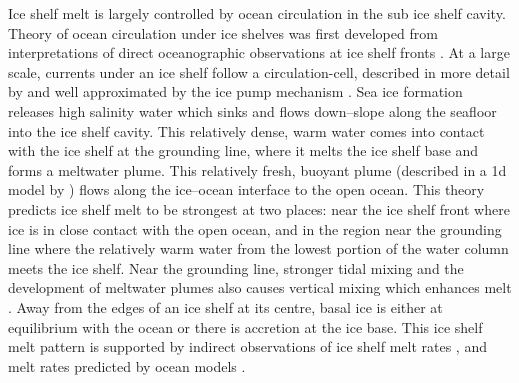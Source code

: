 
Ice shelf melt is largely controlled by ocean circulation in the sub ice shelf cavity. Theory of ocean circulation under ice shelves was first developed from interpretations of direct oceanographic observations at ice shelf fronts \cite [e.g.][] {jacobs1979circulation}.
At a large scale, currents under an ice shelf follow a circulation-cell, described in more detail by \cite{jacobs1992melting} and well approximated by the ice pump mechanism \citep{lewis1986ice}.
Sea ice formation releases high salinity water which sinks and flows down--slope along the seafloor into the ice shelf cavity. This relatively dense, warm water comes into contact with the ice shelf at the grounding line, where it melts the ice shelf base and forms a meltwater plume. This relatively fresh, buoyant plume (described in a 1d model by \cite{jenkins1991one}) flows along the ice--ocean interface to the open ocean. 
This theory predicts ice shelf melt to be strongest at two places: near the ice shelf front where ice is in close contact with the open ocean, and in the region near the grounding line where the relatively warm water from the lowest portion of the water column meets the ice shelf. Near the grounding line, stronger tidal mixing and the development of meltwater plumes also causes vertical mixing which enhances melt \citep{macayeal1984thermohaline, macayeal1985evolution}. Away from the edges of an ice shelf at its centre, basal ice is either at equilibrium with the ocean or there is accretion at the ice base. This ice shelf melt pattern is supported by indirect observations of ice shelf melt rates \cite [e.g.][] {rignot2013ice, mankoff2012role,goldberg2019accurately}, and melt rates predicted by ocean models \cite [e.g.][] {goldberg2019accurately}.

